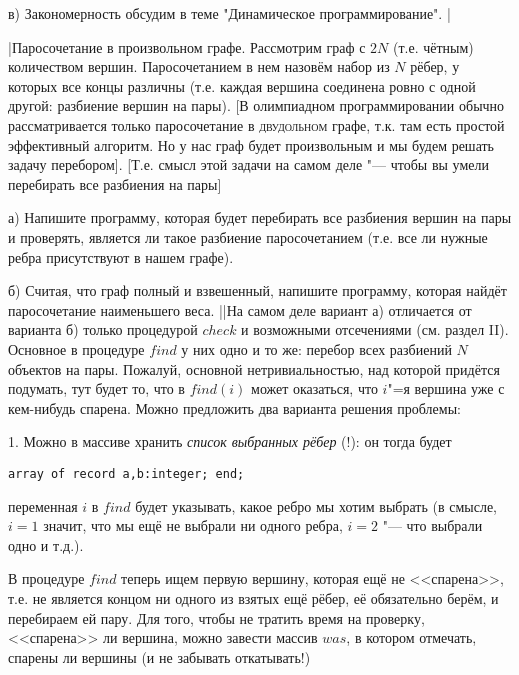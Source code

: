 в) Закономерность обсудим в теме "Динамическое программирование".
|

\task|Паросочетание в произвольном графе. Рассмотрим граф с $2N$ (т.е. чётным) 
количеством вершин. Паросочетанием в нем назовём набор из $N$ рёбер, у которых все 
концы различны (т.е. каждая вершина соединена ровно с одной другой: разбиение 
вершин на пары). [В олимпиадном программировании обычно рассматривается только 
паросочетание в \textsc{двудольном} графе, т.к. там есть простой эффективный алгоритм. 
Но у нас граф будет произвольным и мы будем решать задачу перебором]. 
[Т.е. смысл этой задачи на самом деле "--- чтобы вы умели перебирать все 
разбиения на пары]\par
а) Напишите программу, которая будет перебирать все разбиения вершин на пары и 
проверять, является ли такое разбиение паросочетанием (т.е. все ли нужные ребра 
присутствуют в нашем графе).\par
б) Считая, что граф полный и взвешенный, напишите программу, которая найдёт 
паросочетание наименьшего веса.
||На самом деле вариант а) отличается от варианта б) только процедурой $check$ и 
возможными отсечениями (см. раздел II). Основное в процедуре $find$ у них одно и то же: перебор 
всех разбиений $N$ объектов на пары. Пожалуй, основной нетривиальностью, над которой придётся подумать, тут будет то, что
в $find(i)$ может оказаться, что $i$"=я вершина уже с кем-нибудь спарена. Можно 
предложить два варианта решения проблемы:\par
1. Можно в массиве хранить \textit{список выбранных рёбер} (!): он тогда будет 
\begin{codesampleo}\begin{verbatim}
array of record a,b:integer; end;
\end{verbatim}\end{codesampleo}
переменная $i$ в $find$ будет указывать, какое ребро мы хотим выбрать (в смысле, $i=1$ 
значит, что мы ещё не выбрали ни одного ребра, $i=2$ "--- что выбрали одно и 
т.д.). 

В процедуре $find$ теперь ищем первую вершину, которая ещё не <<спарена>>, т.е. не 
является концом ни одного из взятых ещё рёбер, её обязательно берём, и 
перебираем ей пару. Для того, чтобы не тратить время на проверку, <<спарена>> ли 
вершина, можно завести массив $was$, в котором отмечать, спарены ли вершины (и не 
забывать откатывать!)

